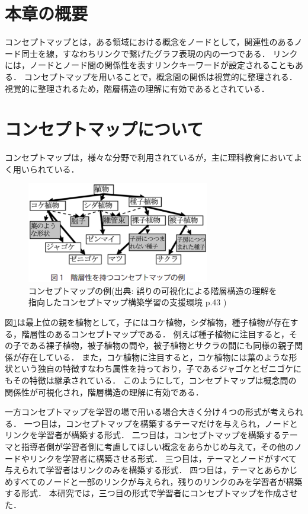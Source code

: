 \section{本章の概要}
コンセプトマップ\cite{concept}とは，ある領域における概念をノードとして，関連性のあるノード同士を線，すなわちリンクで繋げたグラフ表現の内の一つである．
リンクには，ノードとノード間の関係性を表すリンクキーワードが設定されることもある．
コンセプトマップを用いることで，概念間の関係は視覚的に整理される．
視覚的に整理されるため，階層構造の理解に有効であるとされている．

\section{コンセプトマップについて}
コンセプトマップは，様々な分野で利用されているが，主に理科教育においてよく用いられている\cite{yama}\cite{saito}．

\begin{figure}[htbp]
\begin{center}
\includegraphics[width=8cm]{img/example_concept.eps}
\end{center}
\caption{コンセプトマップの例(出典: 誤りの可視化による階層構造の理解を指向したコンセプトマップ構築学習の支援環境 p.43 \cite{toumoto})}
\label{fig:example_concept}
\end{figure}

図\ref{fig:example_concept}は最上位の親を植物として，子にはコケ植物，シダ植物，種子植物が存在する，階層性のあるコンセプトマップである．
例えば種子植物に注目すると，その子である裸子植物，被子植物の間や，被子植物とサクラの間にも同様の親子関係が存在している．
また，コケ植物に注目すると，コケ植物には葉のような形状という独自の特徴すなわち属性を持っており，子であるジャゴケとゼニゴケにもその特徴は継承されている．
このようにして，コンセプトマップは概念間の関係性が可視化され，階層構造の理解に有効である．

一方コンセプトマップを学習の場で用いる場合大きく分け４つの形式が考えられる．
一つ目は，コンセプトマップを構築するテーマだけを与えられ，ノードとリンクを学習者が構築する形式．
二つ目は，コンセプトマップを構築するテーマと指導者側が学習者側に考慮してほしい概念をあらかじめ与えて，その他のノードやリンクを学習者に構築させる形式．
三つ目は，テーマとノードがすべて与えられて学習者はリンクのみを構築する形式．
四つ目は，テーマとあらかじめすべてのノードと一部のリンクが与えられ，残りのリンクのみを学習者が構築する形式．
本研究では，三つ目の形式で学習者にコンセプトマップを作成させた．
